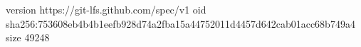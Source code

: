 version https://git-lfs.github.com/spec/v1
oid sha256:753608eb4b4b1eefb928d74a2fba15a44752011d4457d642cab01acc68b749a4
size 49248

